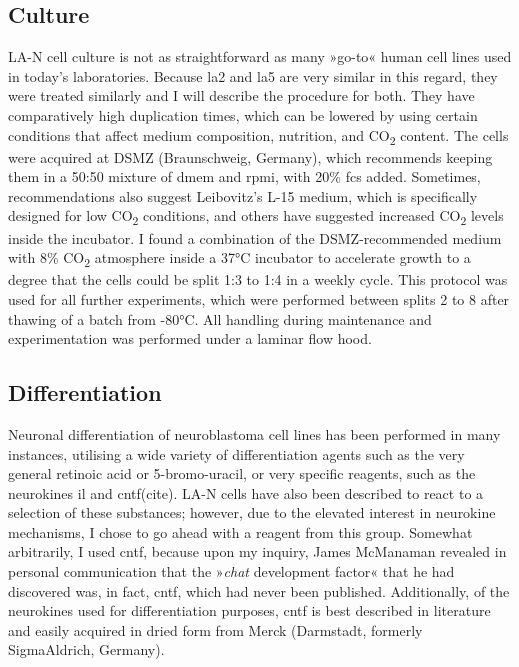 \subsection{Culture}
LA-N cell culture is not as straightforward as many »go-to« human cell lines used in today's laboratories. Because \ac{la2} and \ac{la5} are very similar in this regard, they were treated similarly and I will describe the procedure for both. They have comparatively high duplication times, which can be lowered by using certain conditions that affect medium composition, nutrition, and CO\textsubscript{2} content. The cells were acquired at DSMZ (Braunschweig, Germany), which recommends keeping them in a 50:50 mixture of \ac{dmem} and \ac{rpmi}, with 20\% \ac{fcs} added. Sometimes, recommendations also suggest Leibovitz's L-15 medium, which is specifically designed for low CO\textsubscript{2} conditions, and others have suggested increased CO\textsubscript{2} levels inside the incubator. I found a combination of the DSMZ-recommended medium with 8\% CO\textsubscript{2} atmosphere inside a 37°C incubator to accelerate growth to a degree that the cells could be split 1:3 to 1:4 in a weekly cycle. This protocol was used for all further experiments, which were performed between splits 2 to 8 after thawing of a batch from -80°C. All handling during maintenance and experimentation was performed under a laminar flow hood.

\subsection{Differentiation}
Neuronal differentiation of neuroblastoma cell lines has been performed in many instances, utilising a wide variety of differentiation agents such as the very general retinoic acid or 5-bromo-uracil, or very specific reagents, such as the neurokines \ac{il} and \ac{cntf}(cite). LA-N cells have also been described to react to a selection of these substances; however, due to the elevated interest in neurokine mechanisms, I chose to go ahead with a reagent from this group. Somewhat arbitrarily, I used \ac{cntf}, because upon my inquiry, James McManaman revealed in personal communication that the »\textit{\ac{chat}} development factor« that he had discovered\cite{McManaman1988} was, in fact, \ac{cntf}, which had never been published. Additionally, of the neurokines used for differentiation purposes, \ac{cntf} is best described in literature and easily acquired in dried form from Merck (Darmstadt, formerly SigmaAldrich, Germany).

